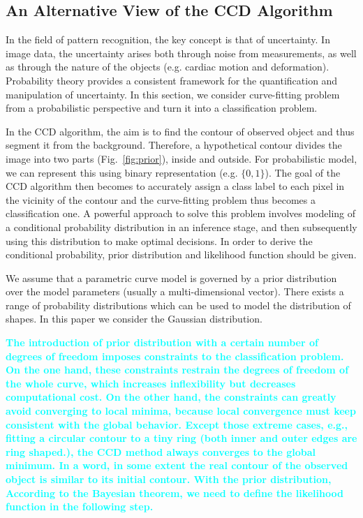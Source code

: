 \documentclass[conference]{IEEEtran}
\newcommand{\review}[1]{\textbf{\textcolor{cyan}{#1}}}
\begin{document}
\subsection{An Alternative View of the CCD Algorithm}
\label{sec:overview}
In the field of pattern recognition, the key concept is that of
uncertainty. In image data, the uncertainty arises both
through noise from measurements, as well as through the nature of
the objects (e.g. cardiac motion and deformation). Probability theory
provides a consistent framework for the quantification and
manipulation of uncertainty.  In this section, we consider curve-fitting
problem from a probabilistic perspective and turn it into
a classification problem.

In the CCD algorithm, the aim is to find the contour of observed object
and thus segment it from the background. Therefore, a hypothetical 
contour divides the image into two parts (Fig.~\ref{fig:prior}), inside
and outside. For probabilistic model, we can represent this using
binary representation (e.g. $\{0, 1\}$). The goal of the CCD algorithm
then becomes to accurately assign a class label to each pixel in the vicinity of the
contour and the curve-fitting problem thus becomes a classification
one. A powerful approach to solve this problem involves modeling of a
conditional probability distribution in an inference stage, and then
subsequently using this distribution to make optimal decisions. In
order to derive the conditional probability, prior distribution and
likelihood function should be given.

We assume that a parametric curve model is governed by a prior distribution
over the model parameters (usually a multi-dimensional vector). There
exists a range of probability distributions which can be used to model
the distribution of shapes. In this paper we consider the Gaussian distribution.

\review{The introduction of prior distribution with a certain number of degrees of freedom
imposes constraints to the classification problem. On the one hand,
these constraints restrain the degrees of freedom of the whole curve,
which increases inflexibility but decreases computational cost. On the
other hand, the constraints can greatly avoid converging to
local minima, because local convergence must keep consistent with the
global behavior. Except those extreme cases, e.g., fitting a circular
contour to a tiny ring (both inner and outer edges are ring shaped.),
the CCD method always converges to the global minimum. In a word, in
some extent the real contour of the observed object is similar to its
initial contour. With the prior distribution, According to the
Bayesian theorem, we need to define the likelihood function in the
following step.}
\end{document}
